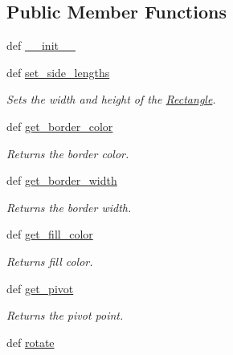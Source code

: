\subsection*{Public Member Functions}
\begin{DoxyCompactItemize}
\item 
def \hyperlink{classcs110graphics_1_1Rectangle_a57049aac9a7f4aa8823112290888a6a8}{\_\-\_\-init\_\-\_\-}
\item 
def \hyperlink{classcs110graphics_1_1Rectangle_a080e6851b24278d7533e0fa9920ea036}{set\_\-side\_\-lengths}
\begin{DoxyCompactList}\small\item\em Sets the width and height of the \hyperlink{classcs110graphics_1_1Rectangle}{Rectangle}. \item\end{DoxyCompactList}\item 
def \hyperlink{classcs110graphics_1_1Fillable_a6772d56158c9fe98a33f01d47cb8aa41}{get\_\-border\_\-color}
\begin{DoxyCompactList}\small\item\em Returns the border color. \item\end{DoxyCompactList}\item 
def \hyperlink{classcs110graphics_1_1Fillable_a6ed7a4288e84a090ec185c8bdff21d0f}{get\_\-border\_\-width}
\begin{DoxyCompactList}\small\item\em Returns the border width. \item\end{DoxyCompactList}\item 
def \hyperlink{classcs110graphics_1_1Fillable_a16c045bc9b63961b696914ee1a1d14d9}{get\_\-fill\_\-color}
\begin{DoxyCompactList}\small\item\em Returns fill color. \item\end{DoxyCompactList}\item 
def \hyperlink{classcs110graphics_1_1Fillable_a514fa0d21297c1372681afae9219fd58}{get\_\-pivot}
\begin{DoxyCompactList}\small\item\em Returns the pivot point. \item\end{DoxyCompactList}\item 
def \hyperlink{classcs110graphics_1_1Fillable_afa6710f6c314de39d19f06d9dd306d7d}{rotate}

\end{DoxyCompactItemize}

